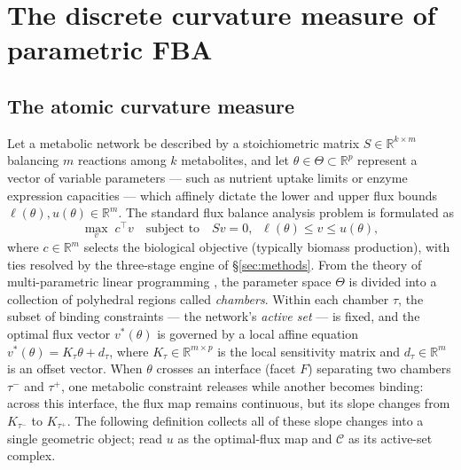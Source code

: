 \documentclass[11pt,a4paper]{article}
\theoremstyle{plain}
\theoremstyle{definition}
\theoremstyle{remark}
\newcommand{\CC}{\mathcal{C}}
\newcommand{\RR}{\mathbb{R}}
\begin{document}
\section{The discrete curvature measure of parametric FBA}
\label{sec:measure}



\subsection{The atomic curvature measure}

Let a metabolic network be described by a stoichiometric matrix
$S \in \RR^{k \times m}$ balancing $m$ reactions among $k$
metabolites, and let $\theta \in \Theta \subset \RR^p$ represent a
vector of variable parameters --- such as nutrient uptake limits or
enzyme expression capacities --- which affinely dictate the lower and
upper flux bounds $\ell(\theta), u(\theta) \in \RR^m$. The standard
flux balance analysis problem is formulated as
\begin{equation}\label{eq:fba_lp}
\max_{v}\; c^\top v
\quad \text{subject to} \quad
Sv = 0, \;\; \ell(\theta) \le v \le u(\theta),
\end{equation}
where $c \in \RR^m$ selects the biological objective (typically
biomass production), with ties resolved by the three-stage engine of
\S\ref{sec:methods}. From the theory of multi-parametric linear
programming \citep{borrelli2003}, the parameter space $\Theta$ is
divided into a collection of polyhedral regions called
\emph{chambers}. Within each chamber $\tau$, the subset of binding
constraints --- the network's \emph{active set} --- is fixed, and the
optimal flux vector $v^*(\theta)$ is governed by a local affine
equation $v^*(\theta) = K_\tau \theta + d_\tau$, where
$K_\tau \in \RR^{m \times p}$ is the local sensitivity matrix and
$d_\tau \in \RR^m$ is an offset vector. When $\theta$ crosses an
interface (facet $F$) separating two chambers $\tau^-$ and $\tau^+$,
one metabolic constraint releases while another becomes binding:
across this interface, the flux map remains continuous, but its slope
changes from $K_{\tau^-}$ to $K_{\tau^+}$. The following definition
collects all of these slope changes into a single geometric object;
read $u$ as the optimal-flux map and $\CC$ as its active-set
complex.
\end{document}
